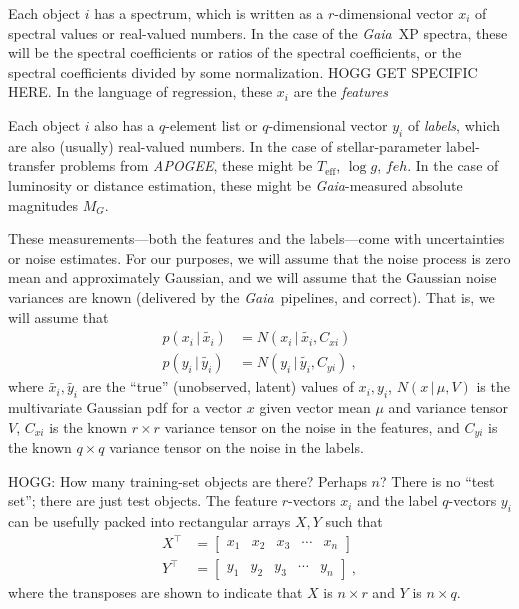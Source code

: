 \documentclass[modern]{aastex631}
\newcommand{\acronym}[1]{\small{#1}}
\newcommand{\project}[1]{\textsl{#1}}
\newcommand{\Gaia}{\project{Gaia}}
\newcommand{\APOGEE}{\project{\acronym{APOGEE}}}
\newcommand{\true}[1]{\widetilde{#1}}
\newcommand{\given}{\,|\,}
\newcommand{\teff}{{T_{\mathrm{eff}}}}
\newcommand{\logg}{\log g}
\begin{document}
Each object $i$ has a spectrum, which is written as a $r$-dimensional vector $x_i$ of spectral values or real-valued numbers.
In the case of the \Gaia\ XP spectra, these will be the spectral coefficients or ratios of the spectral coefficients, or the spectral coefficients divided by some normalization. HOGG GET SPECIFIC HERE. In the language of regression, these $x_i$ are the \emph{features}

Each object $i$ also has a $q$-element list or $q$-dimensional vector $y_i$ of \emph{labels}, which are also (usually) real-valued numbers.
In the case of stellar-parameter label-transfer problems from \APOGEE, these might be $\teff$, $\logg$, $feh$.
In the case of luminosity or distance estimation, these might be \Gaia-measured absolute magnitudes $M_G$.

These measurements---both the features and the labels---come with uncertainties or noise estimates.
For our purposes, we will assume that the noise process is zero mean and approximately Gaussian, and we will assume that the Gaussian noise variances are known (delivered by the \Gaia\ pipelines, and correct).
That is, we will assume that
\begin{align}
  p(x_i\given\true{x_i}) &= N(x_i\given\true{x_i},C_{xi}) \\
  p(y_i\given\true{y_i}) &= N(y_i\given\true{y_i},C_{yi}) ~,
\end{align}
where $\true{x_i}, \true{y_i}$ are the ``true'' (unobserved, latent) values of $x_i, y_i$,
$N(x\given\mu,V)$ is the multivariate Gaussian pdf for a vector $x$ given vector mean $\mu$ and variance tensor $V$,
$C_{xi}$ is the known $r\times r$ variance tensor on the noise in the features,
and $C_{yi}$ is the known $q\times q$ variance tensor on the noise in the labels.

HOGG: How many training-set objects are there? Perhaps $n$? There is no ``test set''; there are just test objects.
The feature $r$-vectors $x_i$ and the label $q$-vectors $y_i$ can be usefully packed into rectangular arrays $X, Y$ such that
\begin{align}
  X^\top &= \begin{bmatrix}x_1 & x_2 & x_3 & \cdots & x_n\end{bmatrix} \\
  Y^\top &= \begin{bmatrix}y_1 & y_2 & y_3 & \cdots & y_n\end{bmatrix} ~,
\end{align}
where the transposes are shown to indicate that $X$ is $n\times r$ and $Y$ is $n\times q$.
\end{document}
